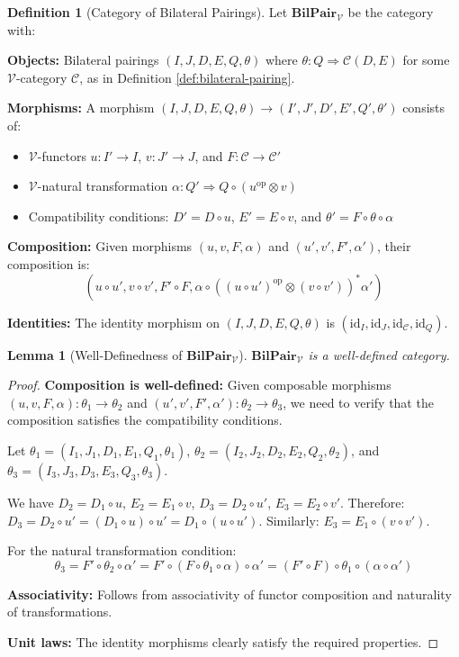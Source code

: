 \documentclass[11pt]{article}
\theoremstyle{plain}
\newtheorem{lemma}[theorem]{Lemma}
\theoremstyle{definition}
\newtheorem{definition}[theorem]{Definition}
\theoremstyle{remark}
\newcommand{\V}{\mathcal{V}}
\newcommand{\C}{\mathcal{C}}
\newcommand{\op}{\mathrm{op}}
\newcommand{\id}{\mathrm{id}}
\begin{document}
\begin{definition}[Category of Bilateral Pairings]\label{def:bilpair-category}
Let $\mathbf{BilPair}_\V$ be the category with:

\textbf{Objects:} Bilateral pairings $(I, J, D, E, Q, \theta)$ where $\theta : Q \Rightarrow \C(D, E)$ for some $\V$-category $\C$, as in Definition \ref{def:bilateral-pairing}.

\textbf{Morphisms:} A morphism $(I, J, D, E, Q, \theta) \to (I', J', D', E', Q', \theta')$ consists of:
\begin{itemize}
\item $\V$-functors $u : I' \to I$, $v : J' \to J$, and $F : \C \to \C'$
\item $\V$-natural transformation $\alpha : Q' \Rightarrow Q \circ (u^{\op} \otimes v)$
\item Compatibility conditions: $D' = D \circ u$, $E' = E \circ v$, and $\theta' = F \circ \theta \circ \alpha$
\end{itemize}

\textbf{Composition:} Given morphisms $(u, v, F, \alpha)$ and $(u', v', F', \alpha')$, their composition is:
$$(u \circ u', v \circ v', F' \circ F, \alpha \circ ((u \circ u')^{\op} \otimes (v \circ v'))^* \alpha')$$

\textbf{Identities:} The identity morphism on $(I, J, D, E, Q, \theta)$ is $(\id_I, \id_J, \id_\C, \id_Q)$.
\end{definition}

\begin{lemma}[Well-Definedness of $\mathbf{BilPair}_\V$]\label{lem:bilpair-welldef}
$\mathbf{BilPair}_\V$ is a well-defined category.
\end{lemma}

\begin{proof}
\textbf{Composition is well-defined:} Given composable morphisms $(u, v, F, \alpha) : \theta_1 \to \theta_2$ and $(u', v', F', \alpha') : \theta_2 \to \theta_3$, we need to verify that the composition satisfies the compatibility conditions.

Let $\theta_1 = (I_1, J_1, D_1, E_1, Q_1, \theta_1)$, $\theta_2 = (I_2, J_2, D_2, E_2, Q_2, \theta_2)$, and $\theta_3 = (I_3, J_3, D_3, E_3, Q_3, \theta_3)$.

We have $D_2 = D_1 \circ u$, $E_2 = E_1 \circ v$, $D_3 = D_2 \circ u'$, $E_3 = E_2 \circ v'$.
Therefore: $D_3 = D_2 \circ u' = (D_1 \circ u) \circ u' = D_1 \circ (u \circ u')$.
Similarly: $E_3 = E_1 \circ (v \circ v')$.

For the natural transformation condition:
$$\theta_3 = F' \circ \theta_2 \circ \alpha' = F' \circ (F \circ \theta_1 \circ \alpha) \circ \alpha' = (F' \circ F) \circ \theta_1 \circ (\alpha \circ \alpha')$$

\textbf{Associativity:} Follows from associativity of functor composition and naturality of transformations.

\textbf{Unit laws:} The identity morphisms clearly satisfy the required properties.
\end{proof}
\end{document}
